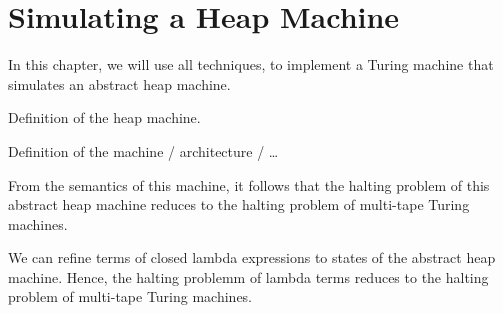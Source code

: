 \chapter{Simulating a Heap Machine}
\label{chap:heap}


In this chapter, we will use all techniques, to implement a Turing machine that simulates an abstract heap machine.

Definition of the heap machine.

Definition of the machine / architecture / \dots

From the semantics of this machine, it follows that the halting problem of this abstract heap machine reduces to the halting problem of multi-tape Turing machines.

We can refine terms of closed lambda expressions to states of the abstract heap machine.
Hence, the halting problemm of lambda terms reduces to the halting problem of multi-tape Turing machines.

